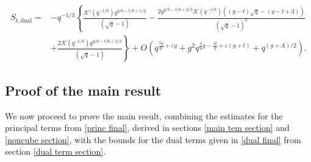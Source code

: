 \documentclass[table]{amsart}
\numberwithin{equation}{section}
\begin{document}
{\small\begin{equation}\label{dual final}
\begin{split}
    S_{t,\mathrm{dual}} =& -q^{-1/3}\left\{ \frac{\mathcal{K}'(q^{-1/6}) q^{g/6-t/6+1/2}}{(\sqrt{q}-1)}-\frac{2 q^{g/6-t/6+2/3}\mathcal{K}(q^{-1/6})\left((g-t)\sqrt{q}-(g-t+3)\right)}{(\sqrt{q}-1)^2}\right.\\
&\left.+\frac{2\mathcal{K}(q^{-1/6})q^{g/6-t/6+2/3}}{(\sqrt{q}-1)}\right\} +O\left(q^{\frac{5 g}{6}+\varepsilon g}+g^2 q^{\frac{3}{4}g -\frac{2t}{3}+\varepsilon (g+t)}+q^{(g+A)/2}\right).
\end{split}
\end{equation}}

\subsection{Proof of the main result}
\par We now proceed to prove the main result, combining the estimates for the principal terms from \eqref{princ final}, derived in sections \ref{main tem section} and \ref{noncube section}, with the bounds for the dual terms given in \eqref{dual final} from section \ref{dual term section}.
\end{document}
